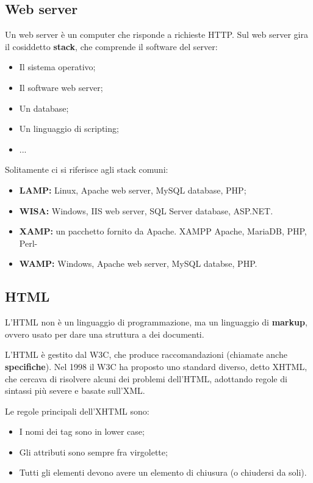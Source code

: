 \documentclass[a4paper,11pt]{article}
\begin{document}
\subsection{Web server}
Un web server è un computer che risponde a richieste HTTP.
Sul web server gira il cosiddetto \textbf{stack}, che comprende il software del server:
\begin{itemize}
	\item Il sistema operativo;
	\item Il software web server;
	\item Un database;
	\item Un linguaggio di scripting;
	\item ...
\end{itemize}

\noindent
Solitamente ci si riferisce agli stack comuni:

\begin{itemize}
	\item \textbf{LAMP:} Linux, Apache web server, MySQL database, PHP;
	\item \textbf{WISA:} Windows, IIS web server, SQL Server database, ASP.NET.
	\item \textbf{XAMP:} un pacchetto fornito da Apache. XAMPP Apache, MariaDB, PHP, Perl-
	\item \textbf{WAMP:} Windows, Apache web server, MySQL databse, PHP.
\end{itemize}

\subsection{HTML}
L'HTML non è un linguaggio di programmazione, ma un linguaggio di \textbf{markup}, ovvero usato per dare una struttura a dei documenti.

L'HTML è gestito dal W3C, che produce raccomandazioni (chiamate anche \textbf{specifiche}).
Nel 1998 il W3C ha proposto uno standard diverso, detto XHTML, che cercava di risolvere alcuni dei problemi dell'HTML, adottando regole di sintassi più severe e basate sull'XML.

Le regole principali dell'XHTML sono:
\begin{itemize}
	\item I nomi dei tag sono in lower case;
	\item Gli attributi sono sempre fra virgolette;
	\item Tutti gli elementi devono avere un elemento di chiusura (o chiudersi da soli).
\end{itemize}
\end{document}
